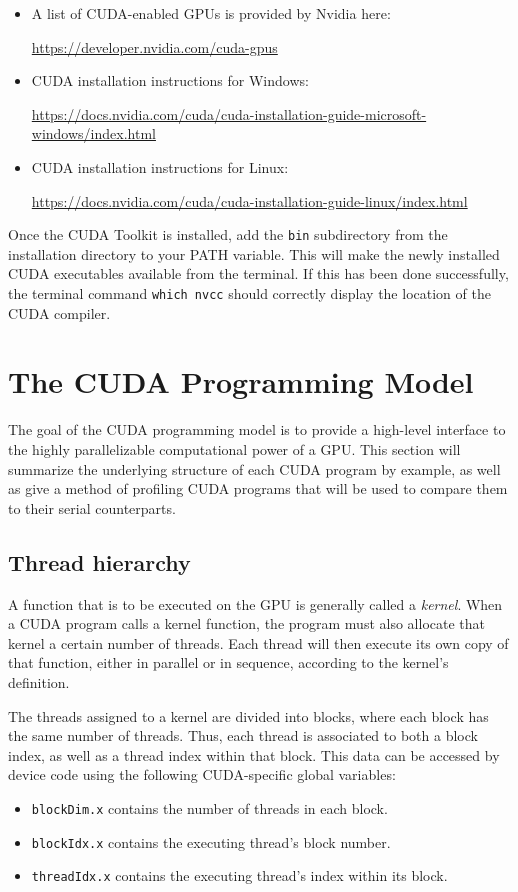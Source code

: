 \documentclass{article}
\theoremstyle{definition}
\begin{document}
\begin{itemize}
\item 
A list of CUDA-enabled GPUs is provided by Nvidia here:

\url{https://developer.nvidia.com/cuda-gpus}

\item 
CUDA installation instructions for Windows:

\url{https://docs.nvidia.com/cuda/cuda-installation-guide-microsoft-windows/index.html}

\item
CUDA installation instructions for Linux:

\url{https://docs.nvidia.com/cuda/cuda-installation-guide-linux/index.html}
\end{itemize} 

Once the CUDA Toolkit is installed, add the \texttt{bin} subdirectory from the installation directory to your PATH variable. This will make the newly installed CUDA executables available from the terminal. If this has been done successfully, the terminal command \texttt{which nvcc} should correctly display the location of the CUDA compiler.

\section{The CUDA Programming Model}
\label{sec/model}

The goal of the CUDA programming model is to provide a high-level interface to the highly parallelizable computational power of a GPU. This section will summarize the underlying structure of each CUDA program by example, as well as give a method of profiling CUDA programs that will be used to compare them to their serial counterparts.

\subsection{Thread hierarchy}
A function that is to be executed on the GPU is generally called a \emph{kernel}. When a CUDA program calls a kernel function, the program must also allocate that kernel a certain number of threads. Each thread will then execute its own copy of that function, either in parallel or in sequence, according to the kernel's definition.

The threads assigned to a kernel are divided into blocks, where each block has the same number of threads. Thus, each thread is associated to both a block index, as well as a thread index within that block. This data can be accessed by device code using the following CUDA-specific global variables:
\begin{itemize}
    \item \texttt{blockDim.x} contains the number of threads in each block.
    \item \texttt{blockIdx.x} contains the executing thread's block number.
    \item \texttt{threadIdx.x} contains the executing thread's index within its block.
\end{itemize}
\end{document}
